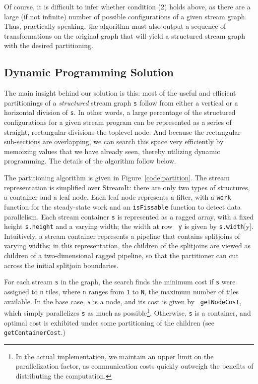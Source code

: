 Of course, it is difficult to infer whether condition (2) holds above,
as there are a large (if not infinite) number of possible
configurations of a given stream graph.  Thus, practically speaking,
the algorithm must also output a sequence of transformations on the
original graph that will yield a structured stream graph with the
desired partitioning.

\subsection{Dynamic Programming Solution}

The main insight behind our solution is this: most of the useful and
efficient partitionings of a {\it structured} stream graph {\tt s}
follow from either a vertical or a horizontal division of {\tt s}.  In
other words, a large percentage of the structured configurations for a
given stream program can be represented as a series of straight,
rectangular divisions the toplevel node.  And because the rectangular
sub-sections are overlapping, we can search this space very
efficiently by memoizing values that we have already seen, thereby
utilizing dynamic programming.  The details of the algorithm follow
below.

The partitioning algorithm is given in Figure~\ref{code:partition}.
The stream representation is simplified over StreamIt: there are only
two types of structures, a container and a leaf node.  Each leaf node
represents a filter, with a {\tt work} function for the steady-state
work and an {\tt isFissable} function to detect data parallelism.
Each stream container {\tt s} is represented as a ragged array, with a
fixed height {\tt s.height} and a varying width; the width at row {\tt
y} is given by {\tt s.width}[y].  Intuitively, a stream container
represents a pipeline that contains splitjoins of varying widths; in
this representation, the children of the splitjoins are viewed as
children of a two-dimensional ragged pipeline, so that the partitioner
can cut across the initial splitjoin boundaries.

For each stream {\tt s} in the graph, the search finds the minimum
cost if {\tt s} were assigned to {\tt n} tiles, where {\tt n} ranges
from {\tt 1} to {\tt N}, the maximum number of tiles available.  In
the base case, {\tt s} is a node, and its cost is given by {\tt
getNodeCost}, which simply parallelizes {\tt s} as much as
possible\footnote{In the actual implementation, we maintain an upper
limit on the parallelization factor, as communication costs quickly
outweigh the benefits of distributing the computation.}.  Otherwise,
{\tt s} is a container, and optimal cost is exhibited under some
partitioning of the children (see {\tt getContainerCost}.)

